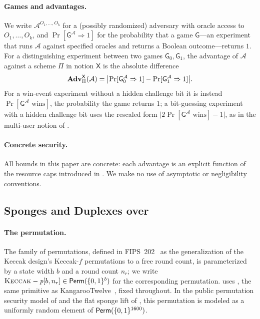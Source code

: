 \paragraph{Games and advantages.}
We write $\mathcal{A}^{O_1, \dots, O_k}$ for a (possibly randomized)
adversary with oracle access to $O_1, \dots, O_k$, and
$\Pr[\mathsf{G}^{\mathcal{A}} \Rightarrow 1]$ for the probability that a
game $\mathsf{G}$---an experiment that runs $\mathcal{A}$ against
specified oracles and returns a Boolean outcome---returns $1$. For a
distinguishing experiment between two games $\mathsf{G}_0, \mathsf{G}_1$,
the advantage of $\mathcal{A}$ against a scheme $\Pi$ in notion
$\mathsf{X}$ is the absolute difference
\[
  \mathbf{Adv}^{\mathsf{X}}_\Pi(\mathcal{A})
  = \bigl| \Pr[\mathsf{G}_0^{\mathcal{A}} \Rightarrow 1]
         - \Pr[\mathsf{G}_1^{\mathcal{A}} \Rightarrow 1] \bigr|.
\]
For a win-event experiment without a hidden challenge bit it is instead
$\Pr[\mathsf{G}^{\mathcal{A}} \text{ wins}]$, the probability the game
returns $1$; a bit-guessing experiment with a hidden challenge bit uses
the rescaled form
$\bigl|2 \Pr[\mathsf{G}^{\mathcal{A}} \text{ wins}] - 1\bigr|$, as in the
multi-user notion of .

\paragraph{Concrete security.}
All bounds in this paper are concrete: each advantage is an explicit
function of the resource caps introduced in
. We make no use of asymptotic or negligibility
conventions.

\subsection{Sponges and Duplexes over \texorpdfstring{\Keccak{}}{Keccak-p}}
\label{sec:sponge}

\paragraph{The \Keccak{} permutation.}
The \Keccak{} family of permutations, defined in
FIPS~202~\cite{FIPS202} as the generalization of the Keccak design's
Keccak-$f$ permutations to a free round count, is parameterized
by a state width $b$ and a round count $n_r$; we write $\textsc{Keccak}-\textit{p}[b, n_r]
\in \mathsf{Perm}(\{0,1\}^b)$ for the corresponding permutation. \TW{} uses
\Keccakp{}, the same primitive as
KangarooTwelve~\cite{BDPVVV16}, fixed throughout. In the
public permutation security model of  and the
flat sponge lift of , this permutation is
modeled as a uniformly random element of $\mathsf{Perm}(\{0,1\}^{1600})$.

